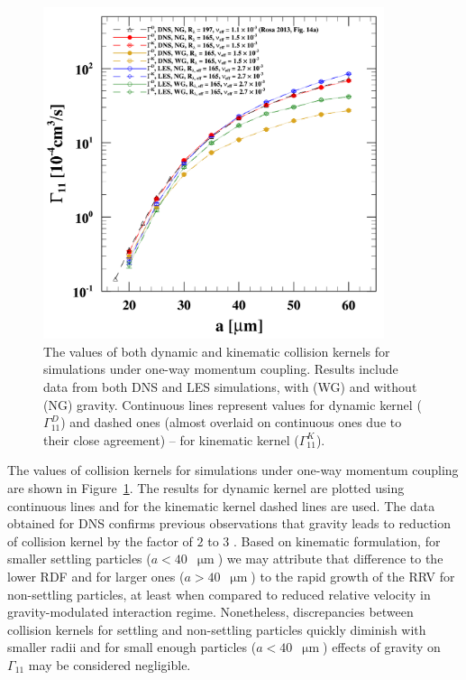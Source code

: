 \documentclass{pracamgren}
\begin{document}
\begin{figure}[h]
\centering
\includegraphics[width=10cm]{figures/2-07_owcgamma.pdf}
\caption{
The values of both dynamic and kinematic collision kernels for simulations under one-way momentum coupling.
Results include data from both DNS and LES simulations, with (WG) and without (NG) gravity.
Continuous lines represent values for dynamic kernel ($\Gamma_{11}^D$) and dashed ones (almost overlaid on continuous ones due to their close agreement) -- for kinematic kernel ($\Gamma_{11}^K$). 
}
\label{fig:owcgamma}
\end{figure}

The values of collision kernels for simulations under one-way momentum coupling are shown in Figure~\ref{fig:owcgamma}.
The results for dynamic kernel are plotted using continuous lines and for the kinematic kernel dashed lines are used.
The data obtained for DNS confirms previous observations that gravity leads to reduction of collision kernel by the factor of $2$ to $3$ \parencite{Rosa2013}.
Based on kinematic formulation, for smaller settling particles (${a < 40}$~$\upmu\text{m}$) we may attribute that difference to the lower RDF and for larger ones (${a > 40}$~$\upmu\text{m}$) to the rapid growth of the RRV for non-settling particles, at least when compared to reduced relative velocity in gravity-modulated interaction regime.
Nonetheless, discrepancies between collision kernels for settling and non-settling particles quickly diminish with smaller radii and for small enough particles (${a < 40}$~$\upmu\text{m}$) effects of gravity on $\Gamma_{11}$ may be considered negligible.
\end{document}
